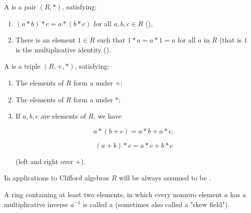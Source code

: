 \begin{definition}[Monoid]
    \label{Monoid}
    \leanok

    A  is a pair $(R, *)$, satisfying:

    \begin{enumerate}
    \item $(a * b) * c = a * (b * c)$ for all $a, b, c \in R$ (),

    \item There is an element $1 \in R$ such that $1 * a = a * 1 = a$ for all $a$ in $R$
    (that is $1$ is the multiplicative identity ().

    \end{enumerate}

\end{definition}

\begin{definition}[Ring]
    \label{Ring}
    \leanok

    A  is a triple $(R, +, *)$, satisfying:

    \begin{enumerate}
    \item The elements of $R$ form a  under $+$;

    \item The elements of $R$ form a  under $*$;

    \item If $a, b, c$ are elements of $R$, we have

    $$
    a * (b + c) = a * b + a * c,
    $$

    $$
    (a + b) * c = a * c + b * c
    $$

    (left and right  over $+$).

    \end{enumerate}

\end{definition}

\begin{remark}
    \label{mk:CommRing}

    In applications to Clifford algebras $R$ will be always assumed to be .
    
\end{remark}

\begin{definition}
    \label{DivisionRing}
    \leanok

    A ring containing at least two elements, in which
    every nonzero element $a$ has a multiplicative inverse $a^{-1}$ is called a  
    (sometimes also called a "skew field").

\end{definition}

